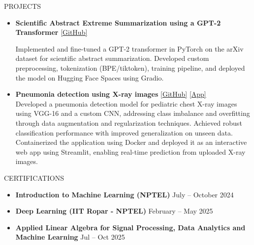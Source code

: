 \documentclass{resume}
\begin{document}
\begin{rSection}{PROJECTS}
\begin{itemize}
\item \textbf{Scientific Abstract Extreme Summarization using a GPT-2 Transformer} \hfill \href{https://github.com/thanuja-bobbepalli/Abstract-Extreame-Summarizer}{[GitHub]}   

Implemented and fine-tuned a GPT-2 transformer in PyTorch on the arXiv dataset for scientific abstract summarization. Developed custom preprocessing, tokenization (BPE/tiktoken), training pipeline, and deployed the model on Hugging Face Spaces using Gradio.  

\item \textbf{Pneumonia detection using X-ray images } \hfill \href{https://github.com/thanuja-bobbepalli/Pneumonia-detection-using-x-ray-imagesr}{[GitHub]} \href{https://pneumonia-detection-using-x-ray-images-tj9amadclyqx6tm6tz8hgx.streamlit.app/} {[App]} \\
Developed a pneumonia detection model for pediatric chest X-ray images using VGG-16 and a custom CNN, addressing class imbalance and overfitting through data augmentation and regularization techniques. Achieved robust classification performance with improved generalization on unseen data. Containerized the application using Docker and deployed it as an interactive web app using Streamlit, enabling real-time prediction from uploaded X-ray images.


\end{itemize}

\end{rSection}


\begin{rSection}{CERTIFICATIONS}

\begin{itemize}
\itemsep -3pt

\item \textbf{Introduction to Machine Learning (NPTEL)} \hfill July -- October 2024

\item \textbf{Deep Learning (IIT Ropar - NPTEL)} \hfill February -- May 2025

\item \textbf{Applied Linear Algebra for Signal Processing, Data Analytics and Machine Learning} \hfill Jul -- Oct 2025

\end{itemize}

\end{rSection}
\end{document}
